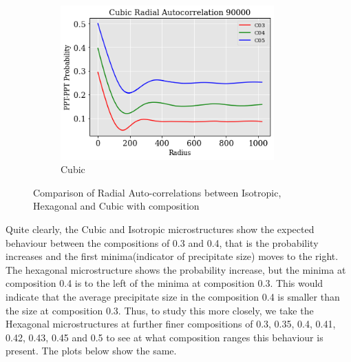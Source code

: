 \documentclass[12pt, a4paper]{report}
\begin{document}
\begin{figure}[H]
\begin{subfigure}{.45\textwidth}
  \centering
  \includegraphics[width=0.9\textwidth]{Pictures/Comparison/Radial Auto comparison/Cub_90k_C345.png}
  \caption{Cubic}
  \label{img:microstrImg}
\end{subfigure}
\caption{Comparison of Radial Auto-correlations between Isotropic, Hexagonal and Cubic with composition}
\label{fig:test22}
\end{figure}

Quite clearly, the Cubic and Isotropic microstructures show the expected behaviour between the compositions of 0.3 and 0.4, that is the probability increases and the first minima(indicator of precipitate size) moves to the right. The hexagonal microstructure shows the probability increase, but the minima at composition 0.4 is to the left of the minima at composition 0.3. This would indicate that the average precipitate size in the composition 0.4 is smaller than the size at composition 0.3. Thus, to study this more closely, we take the Hexagonal microstructures at further finer compositions of 0.3, 0.35, 0.4, 0.41, 0.42, 0.43, 0.45 and 0.5 to see at what composition ranges this behaviour is present. The plots below show the same.
\end{document}
